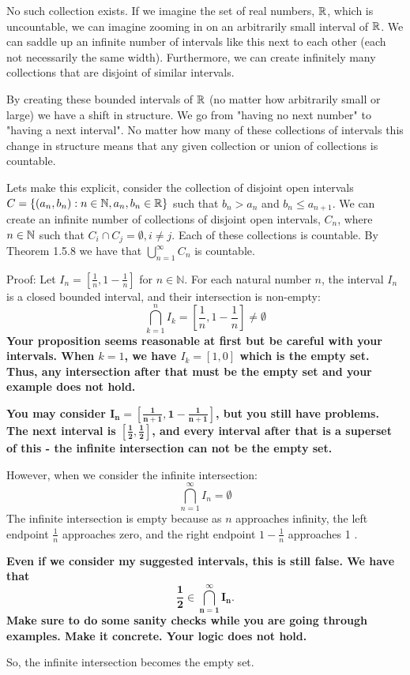 \documentclass{report}
\begin{document}
No such collection exists. If we imagine the set of real numbers, $\RR$, which is uncountable, we can imagine zooming in on an arbitrarily small interval of $\RR$. We can saddle up an infinite number of intervals like this next to each other (each not necessarily the same width). Furthermore, we can create infinitely many collections that are disjoint of similar intervals.
\par
By creating these bounded intervals of $\RR$ (no matter how arbitrarily small or large) we have a shift in structure. We go from "having no next number" to "having a next interval". No matter how many of these collections of intervals this change in structure means that any given collection or union of collections is countable.
\par
Lets make this explicit, consider the collection of disjoint open intervals $C =\{(a_n,b_n): n \in \NN, a_n,b_n \in \RR \}$ such that $b_n > a_n$ and $ b_n \leq a_{n+1}$. We can create an infinite number of collections of disjoint open intervals, $C_n$, where $n \in \NN$ such that $C_i \cap C_j = \emptyset, i \neq  j$.  Each of these collections is countable. By Theorem 1.5.8 we have that $\bigcup_{n =1}^{\infty} C_n $ is countable.


Proof: Let $I_n=\left[\frac{1}{n}, 1-\frac{1}{n}\right]$ for $n \in \mathbb{N}$.
For each natural number $n$, the interval $I_n$ is a closed bounded interval, and their intersection is non-empty:
$$
\bigcap_{k=1}^n I_k=\left[\frac{1}{n}, 1-\frac{1}{n}\right] \neq \emptyset
$$
\textbf{
  Your proposition seems reasonable at first but be careful with your intervals. When $k=1$, we have $I_k = \left[1,0 \right]$ which is the empty set. Thus, any intersection after that must be the empty set and your example does not hold.}
  \par
  \textbf{You may consider $\mathbf{I_n=\left[\frac{1}{n+1}, 1-\frac{1}{n+1} \right]}$, but you still have problems. The next interval is $\mathbf{\left[\frac{1}{2}, \frac{1}{2}\right]}$, and every interval after that is a superset of this - the infinite intersection can not be the empty set.
}
\par\bigskip
However, when we consider the infinite intersection:
$$
\bigcap_{n=1}^{\infty} I_n=\emptyset
$$
The infinite intersection is empty because as $n$ approaches infinity, the left endpoint $\frac{1}{n}$ approaches zero, and the right endpoint $1-\frac{1}{n}$ approaches 1 . 

\par
\textbf{
Even if we consider my suggested intervals, this is still false. We have that  $$\mathbf{ \frac{1}{2} \in  \bigcap_{n=1}^{\infty} I_n}.$$ Make sure to do some sanity checks while you are going through examples. Make it concrete. Your logic does not hold. 
}

So, the infinite intersection becomes the empty set.
\end{document}
